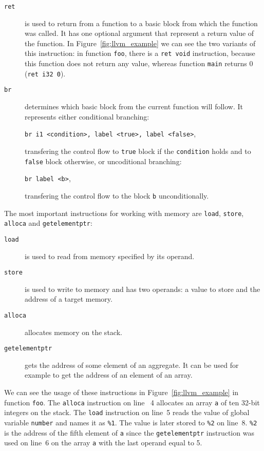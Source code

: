 \begin{description}
\item[\texttt{ret}] is used to return from a function to a basic block
from which the function was called. It has one optional argument that represent
a return value of the function. In Figure~\ref{fig:llvm_example} we can see the
two variants of this instruction: in function \texttt{foo}, there is a
\texttt{ret void} instruction, because this function does not return any value,
whereas function \texttt{main} returns 0 (\texttt{ret i32 0}).

\item[\texttt{br}] determines which basic block from the current function
will follow. It represents either conditional branching:

\texttt{br i1 <condition>, label <true>, label <false>},

transfering the control flow to \texttt{true} block if the \texttt{condition} holds and to
\texttt{false} block otherwise, or uncoditional branching:

\texttt{br label <b>},

transfering the control flow to the block \texttt{b} unconditionally.
\end{description}

The most important instructions for working with memory are \texttt{load},
\texttt{store}, \texttt{alloca} and \texttt{getelementptr}:
\begin{description}
\item[\texttt{load}] is used to read from memory specified by its operand.
\item[\texttt{store}] is used to write to memory and has two operands: a value
to store and the address of a target memory.
\item[\texttt{alloca}] allocates memory on the stack.
\item[\texttt{getelementptr}] gets the address of some element of an aggregate.
It can be used for example to get the address of an element of an array.
\end{description}
We can see the usage of these instructions in Figure~\ref{fig:llvm_example} in
function \texttt{foo}. The \texttt{alloca} instruction on line ~4 allocates an
array \texttt{a} of ten 32-bit integers on the stack. The \texttt{load}
instruction on line~5 reads the value of global variable \texttt{number} and
names it as \texttt{\%1}. The value is later stored to \texttt{\%2} on line~8.
\texttt{\%2} is the address of the fifth element of \texttt{a} since the
\texttt{getelementptr} instruction was used on line~6 on the array \texttt{a}
with the last operand equal to 5.


